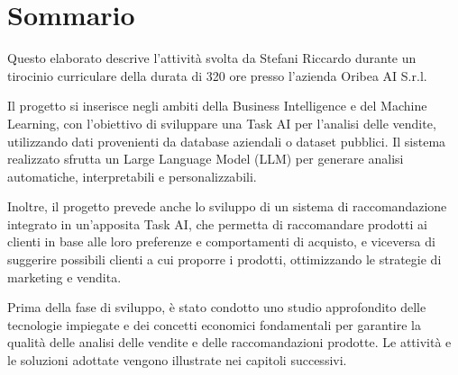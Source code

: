\cleardoublepage
{}
{}
\begingroup
\let\clearpage\relax
\let\cleardoublepage\relax
\let\cleardoublepage\relax

\chapter*{Sommario}

Questo elaborato descrive l’attività svolta da Stefani Riccardo durante un tirocinio curriculare della durata di 320 ore presso l’azienda Oribea AI S.r.l.

Il progetto si inserisce negli ambiti della Business Intelligence e del Machine Learning, con l'obiettivo di sviluppare una Task AI per l'analisi delle vendite, utilizzando dati provenienti da database aziendali o dataset pubblici. Il sistema realizzato sfrutta un Large Language Model (LLM) per generare analisi automatiche, interpretabili e personalizzabili.

Inoltre, il progetto prevede anche lo sviluppo di un sistema di raccomandazione integrato in un'apposita Task AI, che permetta di raccomandare prodotti ai clienti in base alle loro preferenze e comportamenti di acquisto, e viceversa di suggerire possibili clienti a cui proporre i prodotti, ottimizzando le strategie di marketing e vendita.

Prima della fase di sviluppo, è stato condotto uno studio approfondito delle tecnologie impiegate e dei concetti economici fondamentali per garantire la qualità delle analisi delle vendite e delle raccomandazioni prodotte. Le attività e le soluzioni adottate vengono illustrate nei capitoli successivi.




\endgroup

\vfill
